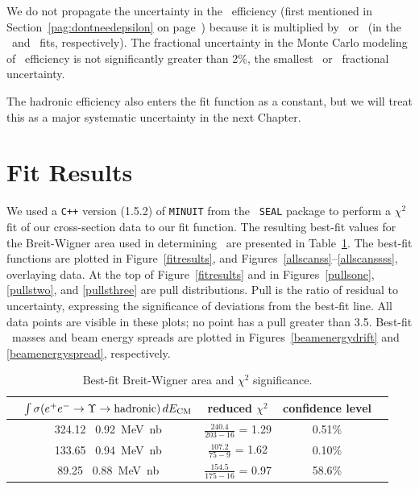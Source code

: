 \documentclass{cornell}
\begin{document}
\label{pag:dontneedepsilon} We do not propagate the uncertainty in the
\tautau\ efficiency (first mentioned in
Section~\ref{pag:dontneedepsilon} on
page~\pageref{pag:dontneedepsilon}) because it is multiplied by \btt\
or \bmm\ (in the \geehadtot\ and \gee\ fits, respectively).  The
fractional uncertainty in the Monte Carlo modeling of \tautau\
efficiency is not significantly greater than 2\%, the smallest \btt\
or \bmm\ fractional uncertainty.

The hadronic efficiency also enters the fit function as a constant,
but we will treat this as a major systematic uncertainty in the next
Chapter.

\section{Fit Results}

We used a {\tt C++} version (1.5.2) of {\tt MINUIT} from the {\tt
SEAL} package \cite{seal} to perform a $\chi^2$ fit of our
cross-section data to our fit function.  The resulting best-fit values
for the Breit-Wigner area used in determining \gee\ are presented in
Table~\ref{tab:bestfit}.  The best-fit functions are plotted in
Figure~\ref{fitresults}, and
Figures~\ref{allscanss}--\ref{allscanssss}, overlaying data.  At the
top of Figure~\ref{fitresults} and in Figures~\ref{pullsone},
\ref{pullstwo}, and \ref{pullsthree} are pull distributions.  Pull is
the ratio of residual to uncertainty, expressing the significance of
deviations from the best-fit line.  All data points are visible in
these plots; no point has a pull greater than 3.5.  Best-fit \ups\
masses and beam energy spreads are plotted in
Figures~\ref{beamenergydrift} and \ref{beamenergyspread},
respectively.

\begin{table}
  \caption[Best-fit Breit-Wigner area and $\chi^2$
  significance]{\label{tab:bestfit} Best-fit Breit-Wigner area and
  $\chi^2$ significance.}
  \begin{center}
    \renewcommand{\arraystretch}{1.35}
    \begin{tabular}{c c c c c}
      \hline\hline
      & \mbox{\hspace{-0.5 cm}} $\int \sigma(e^+e^- \to \Upsilon \to \mbox{hadronic}) \, dE_{\mbox{\scriptsize CM}}$ \mbox{\hspace{-0.5 cm}} & reduced $\chi^2$ & confidence level \\\hline
      \us   & 324.12 \PM\ 0.92~MeV~nb & $\displaystyle \frac{240.4}{203-16}$ = 1.29 & 0.51\% \\
      \uss  & 133.65 \PM\ 0.94~MeV~nb & $\displaystyle \frac{107.2}{75-9}$   = 1.62 & 0.10\% \\
      \usss &  89.25 \PM\ 0.88~MeV~nb & $\displaystyle \frac{154.5}{175-16}$ = 0.97 & 58.6\% \\\hline\hline
    \end{tabular}
  \end{center}
\end{table}
    
\end{document}

